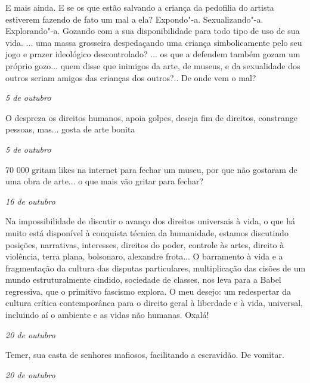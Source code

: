 E mais ainda. E se os que estão salvando a criança da pedofilia do
artista estiverem fazendo de fato um mal a ela? Expondo"-a.
Sexualizando"-a. Explorando"-a. Gozando com a sua disponibilidade para
todo tipo de uso de sua vida. ... uma massa grosseira despedaçando uma
criança simbolicamente pelo seu jogo e prazer ideológico descontrolado?
... os que a defendem também gozam um próprio gozo... quem disse que
inimigos da arte, de museus, e da sexualidade dos outros seriam amigos
das crianças dos outros?.. De onde vem o mal?

\pagebreak

\begin{flushright}
\emph{5 de outubro}
\end{flushright}

O  despreza os direitos humanos, apoia golpes, deseja fim de
direitos, constrange pessoas, mas... gosta de arte bonita

\begin{flushright}
\emph{5 de outubro}
\end{flushright}

70 000 gritam likes na internet para fechar um museu, por que não
gostaram de uma obra de arte... o que mais vão gritar para fechar?

\begin{flushright}
\emph{16 de outubro}
\end{flushright}

Na impossibilidade de discutir o avanço dos direitos universais à vida,
o que há muito está disponível à conquista técnica da humanidade,
estamos discutindo posições, narrativas, interesses, direitos do poder,
controle às artes, direito à violência, terra plana, bolsonaro,
alexandre frota... O barramento à vida e a fragmentação da cultura das
disputas particulares, multiplicação das cisões de um mundo
estruturalmente cindido, sociedade de classes, nos leva para a Babel
regressiva, que o primitivo fascismo explora. O meu desejo: um
redespertar da cultura crítica contemporânea para o direito geral à
liberdade e à vida, universal, incluindo aí o ambiente e as vidas não
humanas. Oxalá!

\begin{flushright}
\emph{20 de outubro}
\end{flushright}

Temer, sua casta de senhores mafiosos, facilitando a escravidão. De
vomitar.

\pagebreak

\begin{flushright}
\emph{20 de outubro}
\end{flushright}

